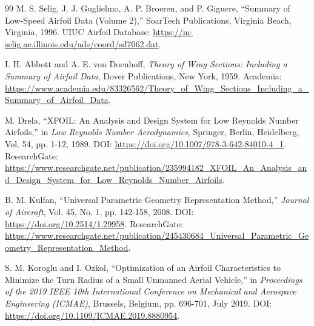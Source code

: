 \documentclass[11pt]{article}
\begin{document}
\begin{thebibliography}{99}
M. S. Selig, J. J. Guglielmo, A. P. Broeren, and P. Giguere, ``Summary of Low-Speed Airfoil Data (Volume 2),'' SoarTech Publications, Virginia Beach, Virginia, 1996. UIUC Airfoil Database: \url{https://m-selig.ae.illinois.edu/ads/coord/sd7062.dat}.

I. H. Abbott and A. E. von Doenhoff, \emph{Theory of Wing Sections: Including a Summary of Airfoil Data}, Dover Publications, New York, 1959. Academia: \url{https://www.academia.edu/83326562/Theory_of_Wing_Sections_Including_a_Summary_of_Airfoil_Data}.

M. Drela, ``XFOIL: An Analysis and Design System for Low Reynolds Number Airfoils,'' in \emph{Low Reynolds Number Aerodynamics}, Springer, Berlin, Heidelberg, Vol. 54, pp. 1-12, 1989. DOI: \url{https://doi.org/10.1007/978-3-642-84010-4_1}. ResearchGate: \url{https://www.researchgate.net/publication/235994182_XFOIL_An_Analysis_and_Design_System_for_Low_Reynolds_Number_Airfoils}.

B. M. Kulfan, ``Universal Parametric Geometry Representation Method,'' \emph{Journal of Aircraft}, Vol. 45, No. 1, pp. 142-158, 2008. DOI: \url{https://doi.org/10.2514/1.29958}. ResearchGate: \url{https://www.researchgate.net/publication/245430684_Universal_Parametric_Geometry_Representation_Method}.

S. M. Koroglu and I. Ozkol, ``Optimization of an Airfoil Characteristics to Minimize the Turn Radius of a Small Unmanned Aerial Vehicle,'' in \emph{Proceedings of the 2019 IEEE 10th International Conference on Mechanical and Aerospace Engineering (ICMAE)}, Brussels, Belgium, pp. 696-701, July 2019. DOI: \url{https://doi.org/10.1109/ICMAE.2019.8880954}.
\end{thebibliography}
\end{document}
